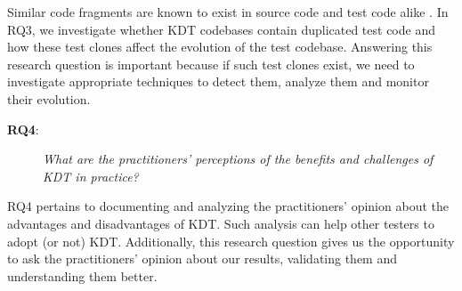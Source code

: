 Similar code fragments are known to exist in source code and test code alike \cite{Baker1995, Roy2009, Rattan2013, Lavoie2017}. In RQ3, we investigate whether KDT codebases contain duplicated test code and how these test clones affect the evolution of the test codebase. Answering this research question is important because if such test clones exist, we need to investigate appropriate techniques to detect them, analyze them and monitor their evolution.

\begin{description}
\item[\textbf{RQ4}:] \emph{What are the practitioners' perceptions of the
    benefits and challenges of KDT in practice?}
\end{description}

RQ4 pertains to documenting and analyzing the practitioners' opinion about the advantages and disadvantages of KDT. Such analysis can help other testers to adopt (or not) KDT. Additionally, this research question gives us the opportunity to ask the practitioners' opinion about our results, validating them and understanding them better.
